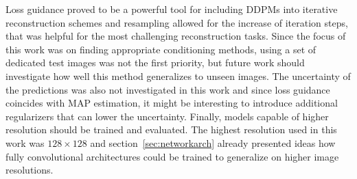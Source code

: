 Loss guidance proved to be a powerful tool for including DDPMs into iterative reconstruction schemes and resampling allowed for the increase of iteration steps, that was helpful for the most challenging reconstruction tasks. Since the focus of this work was on finding appropriate conditioning methods, using a set of dedicated test images was not the first priority, but future work should investigate how well this method generalizes to unseen images. The uncertainty of the predictions was also not investigated in this work and since loss guidance coincides with MAP estimation, it might be interesting to introduce additional regularizers that can lower the uncertainty. Finally, models capable of higher resolution should be trained and evaluated. The highest resolution used in this work was $128\times 128$ and section~\ref{sec:networkarch} already presented ideas how fully convolutional architectures could be trained to generalize on higher image resolutions.